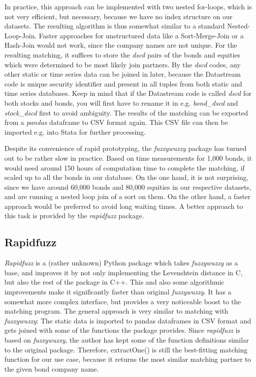 In practice, this approach can be implemented with two nested for-loops, which is not very efficient, but necessary, because we have no index structure on our datasets. The resulting algorithm is thus somewhat similar to a standard Nested-Loop-Join. Faster approaches for unstructured data like a Sort-Merge-Join or a Hash-Join would not work, since the company names are not unique. For the resulting matching, it suffices to store the \textit{dscd} pairs of the bonds and equities which were determined to be most likely join partners. By the \textit{dscd} codes, any other static or time series data can be joined in later, because the Datastream code is unique security identifier and present in all tuples from both static and time series databases. Keep in mind that if the Datastream code is called \textit{dscd} for both stocks and bonds, you will first have to rename it in e.g. \textit{bond\_dscd} and \textit{stock\_dscd }first to avoid ambiguity. The results of the matching can be exported from a \textit{pandas} dataframe to CSV format again. This CSV file can then be imported e.g. into Stata for further processing. 

Despite its convenience of rapid prototyping, the \textit{fuzzywuzzy} package has turned out to be rather slow in practice. Based on time measurements for 1,000 bonds, it would need around 150 hours of computation time to complete the matching, if scaled up to all the bonds in our database. On the one hand, it is not surprising, since we have around 60,000 bonds and 80,000 equities in our respective datasets, and are running a nested loop join of a sort on them. On the other hand, a faster approach would be preferred to avoid long waiting times. A better approach to this task is provided by the \textit{rapidfuzz} package. 

\subsection{Rapidfuzz}
\textit{Rapidfuzz} is a (rather unknown) Python package which takes \textit{fuzzywuzzy} as a base, and improves it by not only implementing the Levenshtein distance in C, but also the rest of the package in C++. This and also some algorithmic improvements make it significantly faster than original \textit{fuzzywuzzy}. It has a somewhat more complex interface, but provides a very noticeable boost to the matching program. The general approach is very similar to matching with \textit{fuzzywuzzy}: The static data is imported to pandas dataframes in CSV format and gets joined with some of the functions the package provides. Since \textit{rapidfuzz} is based on \textit{fuzzywuzzy}, the author has kept some of the function definitions similar to the original package. Therefore, extractOne() is still the best-fitting matching function for our use case, because it returns the most similar matching partner to the given bond company name. 

